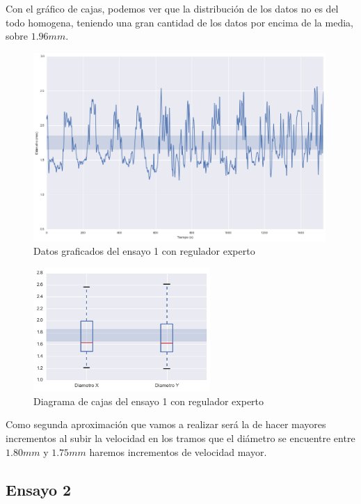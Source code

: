 Con el gráfico de cajas, podemos ver que la distribución de los datos no es del todo homogena, teniendo una gran cantidad de los datos por encima de la media, sobre $1.96 mm$.

\begin{figure}[H]
    \centering
    \includegraphics[width=0.99\textwidth]{images/producciones/11082015/output_9_1.png}
    \caption{Datos graficados del ensayo 1 con regulador experto}
    \label{fig:reg_graf}
\end{figure}

\begin{figure}[H]
    \centering
    \includegraphics[width=0.6\textwidth]{images/producciones/11082015/output_10_1.png}
    \caption{Diagrama de cajas del ensayo 1 con regulador experto}
    \label{fig:reg_cajas}
\end{figure}

Como segunda aproximación que vamos a realizar será la de hacer mayores incrementos al subir la velocidad en los tramos que el diámetro se encuentre entre $1.80 mm$ y $1.75 mm$ haremos incrementos de velocidad mayor.

\subsection{Ensayo 2}


